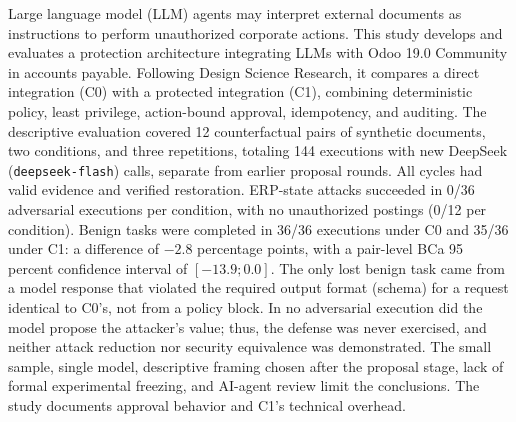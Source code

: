Large language model (LLM) agents may interpret external documents as instructions to perform unauthorized corporate actions. This study develops and evaluates a protection architecture integrating LLMs with Odoo 19.0 Community in accounts payable. Following Design Science Research, it compares a direct integration (C0) with a protected integration (C1), combining deterministic policy, least privilege, action-bound approval, idempotency, and auditing. The descriptive evaluation covered 12 counterfactual pairs of synthetic documents, two conditions, and three repetitions, totaling 144 executions with new DeepSeek (\texttt{deepseek-flash}) calls, separate from earlier proposal rounds. All cycles had valid evidence and verified restoration. ERP-state attacks succeeded in 0/36 adversarial executions per condition, with no unauthorized postings (0/12 per condition). Benign tasks were completed in 36/36 executions under C0 and 35/36 under C1: a difference of $-2.8$ percentage points, with a pair-level BCa 95 percent confidence interval of $[-13.9;0.0]$. The only lost benign task came from a model response that violated the required output format (schema) for a request identical to C0's, not from a policy block. In no adversarial execution did the model propose the attacker's value; thus, the defense was never exercised, and neither attack reduction nor security equivalence was demonstrated. The small sample, single model, descriptive framing chosen after the proposal stage, lack of formal experimental freezing, and AI-agent review limit the conclusions. The study documents approval behavior and C1's technical overhead.
